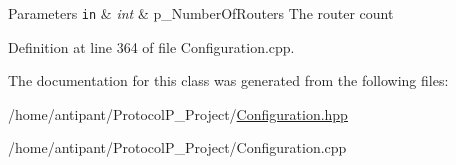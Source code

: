 \begin{DoxyParams}[1]{Parameters}
\mbox{\tt in}  & {\em int} & p\-\_\-\-Number\-Of\-Routers The router count \\
\hline
\end{DoxyParams}


Definition at line 364 of file Configuration.\-cpp.



The documentation for this class was generated from the following files\-:\begin{DoxyCompactItemize}
\item 
/home/antipant/\-Protocol\-P\-\_\-\-Project/\hyperlink{Configuration_8hpp}{Configuration.\-hpp}\item 
/home/antipant/\-Protocol\-P\-\_\-\-Project/Configuration.\-cpp\end{DoxyCompactItemize}
